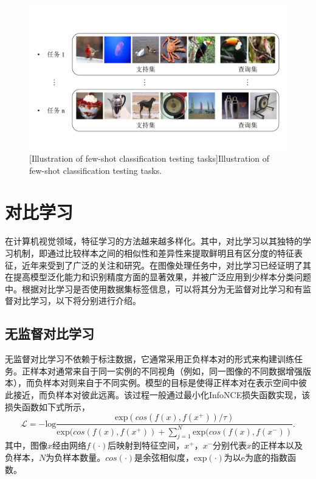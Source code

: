 \begin{figure}[h!]
\centering
{}
\includegraphics[width=1.0\columnwidth]{figures/RelatedWork/少样本分类测试任务.pdf}
[Illustration of few-shot classification testing tasks]{Illustration of few-shot classification testing tasks.}
\label{figure2: 少样本分类测试任务}
\end{figure}

\section[\hspace{-2pt}对比学习]{{\heiti{} \hspace{-8pt}对比学习}}\label{section2: 对比学习}

在计算机视觉领域，特征学习的方法越来越多样化。其中，对比学习以其独特的学习机制，即通过比较样本之间的相似性和差异性来提取鲜明且有区分度的特征表征，近年来受到了广泛的关注和研究。在图像处理任务中，对比学习已经证明了其在提高模型泛化能力和识别精度方面的显著效果，并被广泛应用到少样本分类问题中。根据对比学习是否使用数据集标签信息，可以将其分为无监督对比学习和有监督对比学习，以下将分别进行介绍。

\subsection[\hspace{-2pt}无监督对比学习]{{\heiti{} \hspace{-8pt}无监督对比学习}}\label{section2: 无监督对比学习}

无监督对比学习不依赖于标注数据，它通常采用正负样本对的形式来构建训练任务。正样本对通常来自于同一实例的不同视角（例如，同一图像的不同数据增强版本），而负样本对则来自于不同实例。模型的目标是使得正样本对在表示空间中彼此接近，而负样本对彼此远离。该过程一般通过最小化InfoNCE损失函数实现，该损失函数如下式所示，
\begin{equation}
\label{equation2: infoNCE}
\mathcal{L} = - \text{log}\frac{\text{exp}(cos(f(x), f(x^+)) / \tau)}{\text{exp}(cos(f(x), f(x^+)) + \sum_{j=1}^{N} \text{exp}(cos(f(x), f(x^-))}.
\end{equation}
其中，图像$x$经由网络$f(\cdot)$后映射到特征空间，$x^+$，$x^-$分别代表$x$的正样本以及负样本，$N$为负样本数量。$cos(\cdot)$是余弦相似度，$\text{exp}(\cdot)$为以e为底的指数函数。


